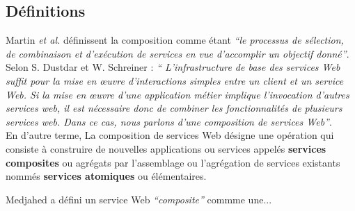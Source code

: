     \subsection{Définitions}
    \label{sec:definitions}

    Martin \emph{et al.} \cite{martin2004owl} définissent
    la composition comme étant \emph{``le processus de sélection, de
      combinaison et d'exécution de services en vue
      d'accomplir un objectif donné''}.\\

    Selon S. Dustdar et W. Schreiner \cite{dustdar2005survey} :
    \emph{`` L'infrastructure de base des services Web suffit pour la
      mise en œuvre d'interactions simples entre un client et un
      service Web. Si la mise en œuvre d'une application métier
      implique l'invocation d'autres services web, il est nécessaire
      donc de combiner les fonctionnalités de plusieurs services
      web. Dans ce cas, nous parlons d'une composition de services
      Web''}.\\

    En d'autre terme, La composition de services Web désigne une
    opération qui consiste à construire de nouvelles applications ou
    services appelés \textbf{services composites} ou agrégats par
    l'assemblage ou l'agrégation de services existants nommés
    \textbf{services atomiques} ou élémentaires.

    Medjahed \cite{medjahed2004thesis} a défini un service Web
    \emph{``composite''} commme une...\\%

   
